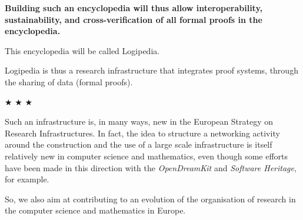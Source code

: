 \medskip

{\bf Building such an encyclopedia will thus allow interoperability,
  sustainability, and cross-verification of all formal proofs in the
  encyclopedia.}

This encyclopedia will be called Logipedia.

Logipedia is thus a research infrastructure that integrates proof
systems, through the sharing of data (formal proofs).

\begin{center}
$\bigstar$ $\bigstar$ $\bigstar$
\end{center}

Such an infrastructure is, in many ways, new in the European Strategy
on Research Infrastructures. In fact, the idea to structure a
networking activity around the construction and the use of a large
scale infrastructure is itself relatively new in computer science and
mathematics, even though some efforts have been made in this direction
with the {\em OpenDreamKit} and {\em Software Heritage}, for example.

So, we also aim at contributing to an evolution of the organisation of
research in the computer science and mathematics in Europe.

